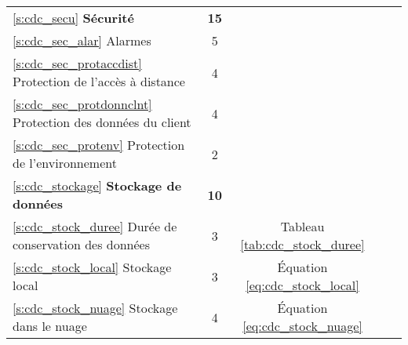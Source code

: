 \begin{table}[htp]
\begin{tabular}{|l|c|c|c|c|}
		\hline
		\hline
		\ref{s:cdc_secu} \textbf{Sécurité} & \textbf{15} & & & \\
		\ref{s:cdc_sec_alar} Alarmes & 5 & & & \\
		\ref{s:cdc_sec_protaccdist} Protection de l’accès à distance & 4 & & & \\
		\ref{s:cdc_sec_protdonnclnt} Protection des données du client & 4 & & & \\
		\ref{s:cdc_sec_protenv} Protection de l’environnement & 2 & & & \\
		\hline
		\hline
		\ref{s:cdc_stockage} \textbf{Stockage de données} & \textbf{10} & & & \\
		\ref{s:cdc_stock_duree} Durée de conservation des données & 3 & Tableau \ref{tab:cdc_stock_duree} & & \\
		\ref{s:cdc_stock_local} Stockage local & 3 & Équation \ref{eq:cdc_stock_local} & & \\
		\ref{s:cdc_stock_nuage} Stockage dans le nuage & 4 & Équation \ref{eq:cdc_stock_nuage} & & \\
		\hline\hline
	\end{tabular}
\end{table}